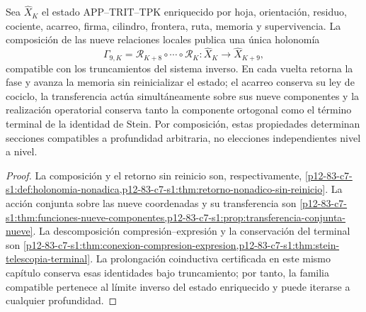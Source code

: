 \begin{theorem}
\label{thm:nucleo-continuidad-conexion-nonadica-conjunta}
Sea \(\widehat X_K\) el estado APP--TRIT--TPK enriquecido por hoja,
orientación, residuo, cociente, acarreo, firma, cilindro, frontera, ruta,
memoria y supervivencia. La composición de las nueve relaciones locales
publica una única holonomía
\[
 \Gamma_{9,K}=\mathcal R_{K+8}\circ\cdots\circ\mathcal R_K
 :\widehat X_K\longrightarrow\widehat X_{K+9},
\]
compatible con los truncamientos del sistema inverso. En cada vuelta retorna
la fase y avanza la memoria sin reinicializar el estado; el acarreo conserva
su ley de cociclo, la transferencia actúa simultáneamente sobre sus nueve
componentes y la realización operatorial conserva tanto la componente
ortogonal como el término terminal de la identidad de Stein. Por composición,
estas propiedades determinan secciones compatibles a profundidad arbitraria,
no elecciones independientes nivel a nivel.
\end{theorem}

\begin{proof}
La composición y el retorno sin reinicio son, respectivamente,
\cref{p12-83-c7-s1:def:holonomia-nonadica,p12-83-c7-s1:thm:retorno-nonadico-sin-reinicio}.
La acción conjunta sobre las nueve coordenadas y su transferencia son
\cref{p12-83-c7-s1:thm:funciones-nueve-componentes,p12-83-c7-s1:prop:transferencia-conjunta-nueve}.
La descomposición compresión--expresión y la conservación del terminal son
\cref{p12-83-c7-s1:thm:conexion-compresion-expresion,p12-83-c7-s1:thm:stein-telescopia-terminal}.
La prolongación coinductiva certificada en este mismo capítulo conserva esas
identidades bajo truncamiento; por tanto, la familia compatible pertenece al
límite inverso del estado enriquecido y puede iterarse a cualquier profundidad.
\end{proof}
